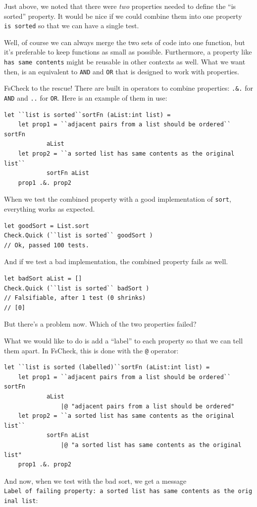Just above, we noted that there were \emph{two} properties needed to
define the ``is sorted'' property. It would be nice if we could combine
them into one property \texttt{is\ sorted} so that we can have a single
test.

Well, of course we can always merge the two sets of code into one
function, but it's preferable to keep functions as small as possible.
Furthermore, a property like \texttt{has\ same\ contents} might be
reusable in other contexts as well.
What we want then, is an equivalent to \texttt{AND} and \texttt{OR} that
is designed to work with properties.

FsCheck to the rescue! There are built in operators to combine
properties: \texttt{.\&.} for \texttt{AND} and \texttt{.\textbar{}.} for
\texttt{OR}.
Here is an example of them in use:

\begin{verbatim}
let ``list is sorted``sortFn (aList:int list) = 
	let prop1 = ``adjacent pairs from a list should be ordered`` sortFn 
            aList 
	let prop2 = ``a sorted list has same contents as the original list`` 
            sortFn aList 
	prop1 .&. prop2 
\end{verbatim}
When we test the combined property with a good implementation of
\texttt{sort}, everything works as expected.

\begin{verbatim}
let goodSort = List.sort
Check.Quick (``list is sorted`` goodSort )
// Ok, passed 100 tests.
\end{verbatim}
And if we test a bad implementation, the combined property fails as
well.

\begin{verbatim}
let badSort aList = []
Check.Quick (``list is sorted`` badSort )
// Falsifiable, after 1 test (0 shrinks) 
// [0]
\end{verbatim}
But there's a problem now. Which of the two properties failed?

What we would like to do is add a ``label'' to each property so that we
can tell them apart. In FsCheck, this is done with the
\texttt{\textbar{}@} operator:

\begin{verbatim}
let ``list is sorted (labelled)``sortFn (aList:int list) = 
    let prop1 = ``adjacent pairs from a list should be ordered`` sortFn 
            aList 
                |@ "adjacent pairs from a list should be ordered"
    let prop2 = ``a sorted list has same contents as the original list`` 
            sortFn aList 
                |@ "a sorted list has same contents as the original list"
    prop1 .&. prop2 
\end{verbatim}
And now, when we test with the bad sort, we get a message
\texttt{Label\ of\ failing\ property:\ a\ sorted\ list\ has\ same\ contents\ as\ the\ 
    original\ list}:

